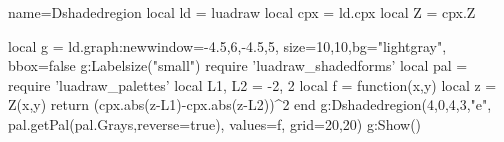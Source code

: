 \begin{luadraw}{name=Dshadedregion}
local ld = luadraw
local cpx = ld.cpx
local Z = cpx.Z

local g = ld.graph:new{window={-4.5,6,-4.5,5}, size={10,10},bg="lightgray", bbox=false}
g:Labelsize("small")
require 'luadraw_shadedforms'
local pal = require 'luadraw_palettes'
local L1, L2 = -2, 2
local f = function(x,y) 
    local z = Z(x,y)
    return (cpx.abs(z-L1)-cpx.abs(z-L2))^2
end
g:Dshadedregion({4,0,4,3,"e"}, pal.getPal(pal.Grays,{reverse=true}), {values=f, grid={20,20}})
g:Show()
\end{luadraw}
